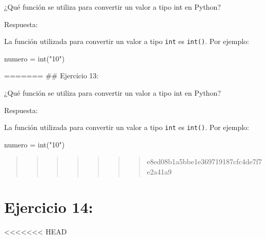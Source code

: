 \documentclass[
  a4paper,
  DIV=11,
  numbers=noendperiod,
  onepage,
  openany]{scrreprt}
\newenvironment{Shaded}{\begin{snugshade}}{\end{snugshade}}
\newcommand{\BuiltInTok}[1]{\textcolor[rgb]{0.00,0.23,0.31}{#1}}
\newcommand{\NormalTok}[1]{\textcolor[rgb]{0.00,0.23,0.31}{#1}}
\newcommand{\OperatorTok}[1]{\textcolor[rgb]{0.37,0.37,0.37}{#1}}
\newcommand{\StringTok}[1]{\textcolor[rgb]{0.13,0.47,0.30}{#1}}
\begin{document}
¿Qué función se utiliza para convertir un valor a tipo int en Python?

Respuesta:

La función utilizada para convertir un valor a tipo \texttt{int} es
\texttt{int()}. Por ejemplo:

\begin{Shaded}
\begin{Highlighting}[]
\NormalTok{numero }\OperatorTok{=} \BuiltInTok{int}\NormalTok{(}\StringTok{"10"}\NormalTok{)}
\end{Highlighting}
\end{Shaded}

======= \#\# Ejercicio 13:

¿Qué función se utiliza para convertir un valor a tipo int en Python?

Respuesta:

La función utilizada para convertir un valor a tipo \texttt{int} es
\texttt{int()}. Por ejemplo:

\begin{Shaded}
\begin{Highlighting}[]
\NormalTok{numero }\OperatorTok{=} \BuiltInTok{int}\NormalTok{(}\StringTok{"10"}\NormalTok{)}
\end{Highlighting}
\end{Shaded}

\begin{quote}
\begin{quote}
\begin{quote}
\begin{quote}
\begin{quote}
\begin{quote}
\begin{quote}
e8ed08b1a5bbe1e369719187cfc4de7f7e2a41a9
\end{quote}
\end{quote}
\end{quote}
\end{quote}
\end{quote}
\end{quote}
\end{quote}

\hypertarget{ejercicio-14}{%
\chapter{Ejercicio 14:}\label{ejercicio-14}}

\textless\textless\textless\textless\textless\textless\textless{} HEAD
\end{document}
